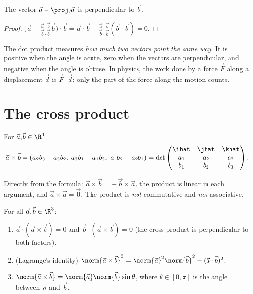 \begin{proposition}\label{prop:projperp}
The vector $\vec a-\proj_{\vec b}\vec a$ is perpendicular to $\vec b$.
\end{proposition}

\begin{proof}
$\bigl(\vec a-\tfrac{\vec a\cdot\vec b}{\vec b\cdot\vec b}\vec b\bigr)\cdot\vec b=\vec a\cdot\vec b-\tfrac{\vec a\cdot\vec b}{\vec b\cdot\vec b}(\vec b\cdot\vec b)=0$.
\end{proof}

\begin{intuition}
The dot product measures \emph{how much two vectors point the same way}. It is positive when the angle is acute, zero when the vectors are perpendicular, and negative when the angle is obtuse. In physics, the work done by a force $\vec F$ along a displacement $\vec d$ is $\vec F\cdot\vec d$: only the part of the force along the motion counts.
\end{intuition}

\section{The cross product}

\begin{definition}
For $\vec a,\vec b\in\R^3$,
\[
\vec a\times\vec b=(a_2b_3-a_3b_2,\ a_3b_1-a_1b_3,\ a_1b_2-a_2b_1)
=\det\begin{pmatrix}\ihat&\jhat&\khat\\a_1&a_2&a_3\\b_1&b_2&b_3\end{pmatrix}.
\]
\end{definition}

Directly from the formula: $\vec a\times\vec b=-\,\vec b\times\vec a$, the product is linear in each argument, and $\vec a\times\vec a=\vec 0$. The product is \emph{not} commutative and \emph{not} associative.

\begin{theorem}\label{thm:crossprops}
For all $\vec a,\vec b\in\R^3$:
\begin{enumerate}[label=(\alph*)]
  \item $\vec a\cdot(\vec a\times\vec b)=0$ and $\vec b\cdot(\vec a\times\vec b)=0$ (the cross product is perpendicular to both factors).
  \item (Lagrange's identity) $\norm{\vec a\times\vec b}^2=\norm{\vec a}^2\norm{\vec b}^2-(\vec a\cdot\vec b)^2$.
  \item $\norm{\vec a\times\vec b}=\norm{\vec a}\norm{\vec b}\sin\theta$, where $\theta\in[0,\pi]$ is the angle between $\vec a$ and $\vec b$.
\end{enumerate}
\end{theorem}

